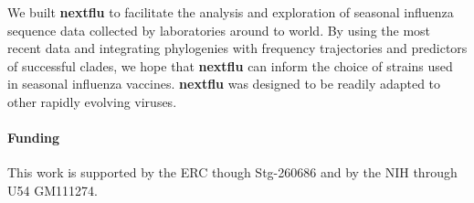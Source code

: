 \documentclass{bioinfo}
\newcommand{\nextflu}{\textbf{nextflu}}
\begin{document}
We built \nextflu{} to facilitate the analysis and exploration of seasonal influenza sequence data collected by laboratories around to world.
By using the most recent data and integrating phylogenies with frequency trajectories and predictors of successful clades, we hope that \nextflu{} can inform the choice of strains used in seasonal influenza vaccines. 
\nextflu{} was designed to be readily adapted to other rapidly evolving viruses.
 
\paragraph{Funding\textcolon}This work is supported by the ERC though Stg-260686 and by the NIH through U54 GM111274.


\end{document}
